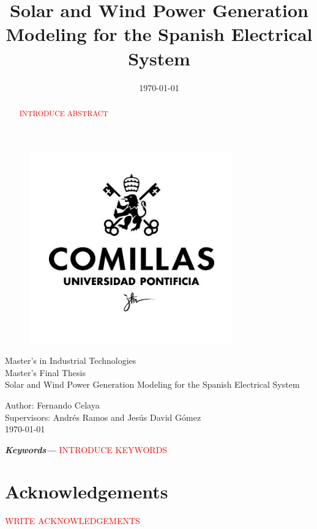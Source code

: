 \documentclass[12pt,a4paper,twoside]{article}
\title{Solar and Wind Power Generation Modeling for the Spanish Electrical System}
\date{\today}
\providecommand{\keywords}[1]
{
  \small	
  \textbf{\textit{Keywords---}} #1
}
\begin{document}
\pagestyle{empty}
\begin{titlepage}
  \begin{figure}
    \centering
    \includegraphics[width=0.3\linewidth]{assets/logo-comillas.png}
  \end{figure}
  \centering
  \Large 
  Master's in Industrial Technologies \\ Master's Final Thesis\\[36px]
  \Huge 
  Solar and Wind Power Generation Modeling for the Spanish Electrical System\\
  \Large
  \raggedright
  \vspace*{\fill}
  Author: Fernando Celaya\\
  Supervisors: Andrés Ramos and Jesús David Gómez\\
  \today

\end{titlepage}
\newpage

\begin{abstract}
  \textcolor{red}{INTRODUCE ABSTRACT}
\end{abstract}
\keywords{\textcolor{red}{INTRODUCE KEYWORDS}}
\newpage

\section*{Acknowledgements}
\textcolor{red}{WRITE ACKNOWLEDGEMENTS} 
\newpage

\thispagestyle{empty}
\tableofcontents
\newpage

\thispagestyle{empty}
\listoffigures
\listoftables
\newpage


\pagestyle{plain}
\clearpage
{} 

\newpage

\newpage

\newpage

\newpage

\newpage

\newpage
\begin{appendices}

\newpage
\end{appendices}

\printbibliography[heading=bibintoc]
\end{document}
